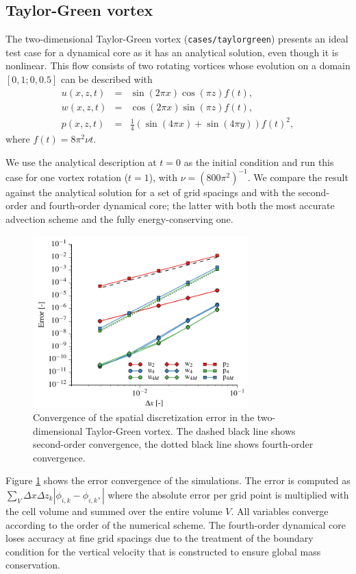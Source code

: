 \documentclass[gmd]{copernicus}
\begin{document}
\subsection{Taylor-Green vortex}
The two-dimensional Taylor-Green vortex (\texttt{cases/taylorgreen}) presents an ideal test case for a dynamical core as it has an analytical solution, even though it is nonlinear. This flow consists of two rotating vortices whose evolution on a domain $\left[0,1; 0,0.5 \right]$ can be described with
\begin{eqnarray}
u(x,z,t) & = & \sin(2\pi x) \cos(\pi z) f(t),\\
w(x,z,t) & = & \cos(2\pi x) \sin(\pi z) f(t),\\
p(x,z,t) & = & \tfrac{1}{4} \left(\sin(4 \pi x) + \sin(4 \pi y) \right) f(t)^2,
\end{eqnarray}
where $f(t) = 8 \pi^2 \nu t$.

We use the analytical description at $t=0$ as the initial condition and run this case for one vortex rotation ($t = 1$), with $\nu = (800 \pi^2)^{-1}$. We compare the result against the analytical solution for a set of grid spacings and with the second-order and fourth-order dynamical core; the latter with both the most accurate advection scheme and the fully energy-conserving one.
\begin{figure}[t]
	\vspace*{2mm}
	\begin{center}
		\includegraphics[width=8.3cm]{figs/taylorgreen.pdf}
	\end{center}
	\caption{Convergence of the spatial discretization error in the two-dimensional Taylor-Green vortex. The dashed black line shows second-order convergence, the dotted black line shows fourth-order convergence.}\label{fig:taylorgreen}
\end{figure}

Figure \ref{fig:taylorgreen} shows the error convergence of the simulations. The error is computed as $\sum_V \Delta x \Delta z_k \left| \phi_{i,k} - \phi_{i,k}, \right|$ where the absolute error per grid point is multiplied with the cell volume and summed over the entire volume $V$. All variables converge according to the order of the numerical scheme. The fourth-order dynamical core loses accuracy at fine grid spacings due to the treatment of the boundary condition for the vertical velocity that is constructed to ensure global mass conservation.
\end{document}
